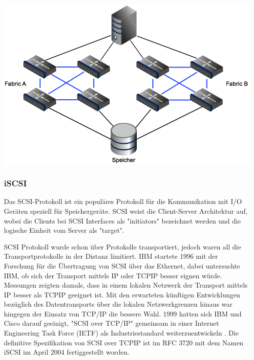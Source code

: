 \begin{center}
\includegraphics[width=\linewidth, keepaspectratio = true]{media/MashedFabric.png}
\end{center}

\subsubsection{iSCSI}
Das SCSI-Protokoll ist ein populäres Protokoll für die Kommunikation mit I/O Geräten speziell für Speichergeräte. SCSI weist die Client-Server Architektur auf, wobei die Clients bei SCSI Interfaces als "initiators" bezeichnet werden und die logische Einheit vom Server als "target".

SCSI Protokoll wurde schon über Protokolle transportiert, jedoch waren all die Transportprotokolle in der Distanz limitiert. \gls{IBM} startete 1996 mit der Forschung für die Übertragung von SCSI über das Ethernet, dabei untersuchte \gls{IBM}, ob sich der Transport mittels IP oder \gls{TCPIP} besser eignen würde. Messungen zeigten damals, dass in einem lokalen Netzwerk der Transport mittels IP besser als \gls{TCPIP} geeignet ist. Mit den erwarteten künftigen Entwicklungen bezüglich des Datentransports über die lokalen Netzwerkgrenzen hinaus war hingegen der Einsatz von TCP/IP die bessere Wahl. 1999 hatten sich \gls{IBM} und \gls{Cisco} darauf geeinigt, "SCSI over TCP/IP" gemeinsam in einer Internet Engineering Task Force (\gls{IETF}) als Industriestandard weiterzuentwickeln \cite{JohnL.202}. Die definitive Spezifikation von SCSI over \gls{TCPIP} ist im \gls{RFC} 3720 mit dem Namen iSCSI im April 2004 fertiggestellt worden. \cite{J.Satran2004}

